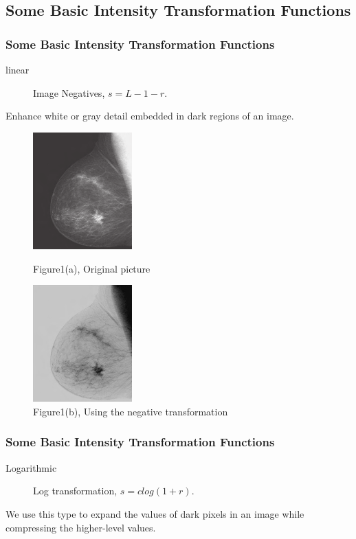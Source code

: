 \documentclass[notheorems, serif, table, compress]{beamer}  %
\begin{document}
\subsection{Some Basic Intensity Transformation Functions}%
\begin{frame}
\frametitle{Some Basic Intensity Transformation Functions}
 

\begin{description}
\item [linear] Image Negatives, $s=L-1-r$.  %
\end{description}
Enhance white or gray detail embedded in dark regions of an image.%



 \begin{figure}[!ht]
  \begin{minipage}[t]{0.4\textwidth}	
  \centering
  \includegraphics[width=1.5in]{fanzhuan.png}
  \caption{Figure1(a), Original picture}
  \end{minipage}
  \begin{minipage}[t]{0.4\textwidth}
  \centering
  \includegraphics[width=1.5in]{fanzhuanout.png}
  \caption{Figure1(b), Using the negative transformation}
  \end{minipage}
  \end{figure} 

\end{frame}

\begin{frame}

\frametitle{Some Basic Intensity Transformation Functions}
    
\begin{description}
\item [Logarithmic]Log transformation, $s = clog(1 + r)$.

\end{description}
 We use this type to expand the values of dark pixels in an image while compressing the higher-level values.
\end{frame}
\end{document}
